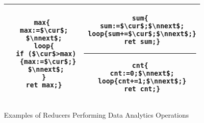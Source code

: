\begin{figure}
	\centering
	\lstset{language=C,
		basicstyle=\ttfamily\scriptsize}
	\begin{tabular}{|c|c|}
		\hline
		\begin{minipage}[t]{0.4\textwidth}
		\vspace{-0.5cm}
			\begin{lstlisting}[mathescape=true]
max{
 max:=$\cur$;
 $\nnext$;
 loop{
  if ($\cur$>max)
   {max:=$\cur$;}
  $\nnext$;
 }
 ret max;}
	\end{lstlisting}
		\end{minipage}&
		\begin{minipage}[t]{0.4\textwidth}
		\vspace{-0.5cm}
			\begin{lstlisting}[mathescape=true]
sum{
 sum:=$\cur$;$\nnext$;
 loop{sum+=$\cur$;$\nnext$;}
 ret sum;}
			\end{lstlisting}
\hrule\vspace{0.1cm}%
			\begin{lstlisting}[mathescape=true]
cnt{
 cnt:=0;$\nnext$;
 loop{cnt+=1;$\nnext$;}
 ret cnt;}
			\end{lstlisting}			
		\end{minipage}\\
		\hline		
	\end{tabular}
	\caption{Examples of Reducers Performing Data Analytics Operations}
	\label{fig:examples}
	\vspace{-4mm}
\end{figure}
